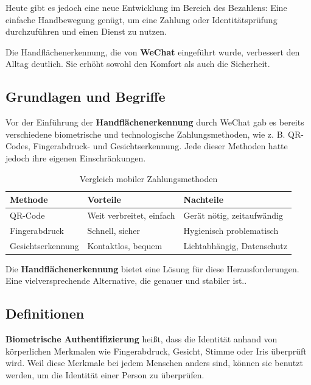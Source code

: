 \documentclass[paper=a4,fontsize=12pt,ngerman]{scrartcl}
\begin{document}
Heute gibt es jedoch eine neue Entwicklung im Bereich des Bezahlens: Eine einfache Handbewegung genügt, um eine Zahlung oder Identitätsprüfung durchzuführen und einen Dienst zu nutzen.\cite{tencent2024article}

Die Handflächenerkennung, die von \textbf{WeChat} eingeführt wurde, verbessert den Alltag deutlich. Sie erhöht sowohl den Komfort als auch die Sicherheit.


\subsection{Grundlagen und Begriffe}

Vor der Einführung der \textbf{Handflächenerkennung} durch WeChat gab es bereits 
verschiedene biometrische und technologische Zahlungsmethoden, wie z. B. QR-Codes, 
Fingerabdruck- und Gesichtserkennung. Jede dieser Methoden hatte jedoch ihre eigenen 
Einschränkungen.

\begin{table}[h]
\centering
\begin{tabular}{|l|p{5cm}|p{5cm}|}
\hline
\textbf{Methode} & \textbf{Vorteile} & \textbf{Nachteile} \\ 
\hline
QR-Code & Weit verbreitet, einfach & Gerät nötig, zeitaufwändig \\
\hline
Fingerabdruck & Schnell, sicher & Hygienisch problematisch \\
\hline
Gesichtserkennung & Kontaktlos, bequem & Lichtabhängig, Datenschutz \\
\hline
\end{tabular}
\caption{Vergleich mobiler Zahlungsmethoden}
\label{tab:zahlungsmethoden}
\end{table}

Die \textbf{Handflächenerkennung} bietet eine Lösung für diese Herausforderungen.
Eine vielversprechende Alternative, die genauer und stabiler ist.\cite{tang2022wechat}. 

\vspace*{1.5cm}

\subsection{Definitionen}
\textbf{Biometrische Authentifizierung} heißt, dass die Identität anhand von körperlichen Merkmalen wie Fingerabdruck, Gesicht, Stimme oder Iris überprüft wird. Weil diese Merkmale bei jedem Menschen anders sind, können sie benutzt werden, um die Identität einer Person zu überprüfen. \cite{geeksforgeeks2025palm}
\end{document}
